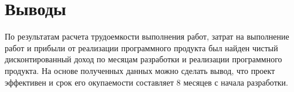 \section{Выводы}

По результатам расчета трудоемкости выполнения работ, затрат на выполнение работ и прибыли от реализации программного продукта был найден чистый дисконтированный доход по месяцам разработки и реализации программного продукта. На основе полученных данных можно сделать вывод, что проект эффективен и срок его окупаемости составляет 8 месяцев с начала разработки.
